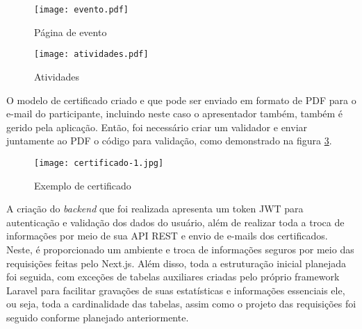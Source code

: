 \begin{figure}[H]
    \caption{\label{evento}Página de evento}
    \vspace{5pt}
    \centering
    \texttt{[image: evento.pdf]}
    \vspace{5pt}
\end{figure}
\begin{figure}[h]
    \caption{\label{atividades}Atividades}
    \vspace{5pt}
    \centering
    \texttt{[image: atividades.pdf]}
    \vspace{5pt}
\end{figure}
O modelo de certificado criado e que pode ser enviado em formato de PDF para o e-mail do participante, incluindo neste caso o apresentador também, também é gerido pela aplicação. Então, foi necessário criar um validador e enviar juntamente ao PDF o código para validação, como demonstrado na figura \ref{certificado}.

\begin{figure}[H]
    \caption{\label{certificado}Exemplo de certificado}
    \vspace{5pt}
    \centering
    \texttt{[image: certificado-1.jpg]}
    \vspace{5pt}
\end{figure}

A criação do \textit{backend} que foi realizada apresenta um token JWT para autenticação e validação dos dados do usuário, além de realizar toda a troca de informações por meio de sua API REST e envio de e-mails dos certificados. Neste, é proporcionado um ambiente e troca de informações seguros por meio das requisições feitas pelo Next.js. Além disso, toda a estruturação inicial planejada foi seguida, com exceções de tabelas auxiliares criadas pelo próprio framework Laravel para facilitar gravações de suas estatísticas e informações essenciais ele, ou seja, toda a cardinalidade das tabelas, assim como o projeto das requisições foi seguido conforme planejado anteriormente.

